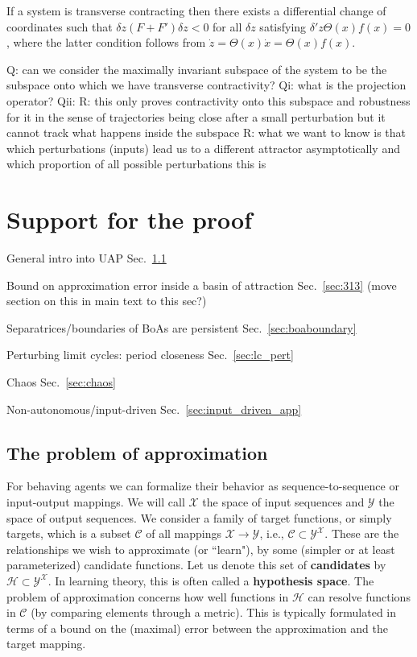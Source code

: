 \documentclass{article}
\newcommand{\ascomment}[1]{\textcolor{ascolor}{(#1)}}
\theoremstyle{definition} \newtheorem{definition}{Definition}
\theoremstyle{remark} \newtheorem{remark}{Remark}
\newcounter{ct}
\begin{document}
If a system is transverse contracting then there exists a differential change of coordinates such that $\delta z(F + F')\delta z < 0$ for all $\delta z$ satisfying $\delta' z \Theta(x)f (x) = 0$, where the latter condition follows from  $\dot z= \Theta(x) \dot x = \Theta(x)f (x)$.

Q: can we consider the maximally invariant subspace of the system to be the subspace onto which we have transverse contractivity?
Qi: what is the projection operator?
Qii: 
R: this only proves contractivity onto this subspace and robustness for it in the sense of trajectories being close after a small perturbation but it cannot track what happens inside the subspace
R: what we want to know is that which perturbations (inputs) lead us to a different attractor asymptotically and which proportion of all possible perturbations this is 






\newpage
\section{Support for the proof}
General intro into UAP Sec.~\ref{sec:approximationtheory}

Bound on approximation error inside a basin of attraction Sec.~\ref{sec:313} \ascomment{move section on this in main text to this sec?}

Separatrices/boundaries of BoAs are persistent Sec.~\ref{sec:boaboundary}

Perturbing limit cycles: period closeness Sec.~\ref{sec:lc_pert}

Chaos Sec.~\ref{sec:chaos} 

Non-autonomous/input-driven Sec.~\ref{sec:input_driven_app} 

\subsection{The problem of approximation}\label{sec:approximationtheory} %
For behaving agents we can formalize their behavior as sequence-to-sequence or input-output mappings.
We will call $\mathcal{X}$ the space of input sequences and $\mathcal{Y}$ the space of output sequences.
We consider a family of target functions, or simply targets, which is a subset \(\mathcal{C} \) of all mappings \( \mathcal{X} \rightarrow \mathcal{Y} \), i.e., \( \mathcal{C} \subset \mathcal{Y}^\mathcal{X} \). 
These are the relationships we wish to approximate (or ``learn"), by some (simpler or at least parameterized) candidate functions.
Let us denote this set of \textbf{candidates} by \( \mathcal{H} \subset \mathcal{Y}^\mathcal{X} \).
In learning theory, this is often called a \textbf{hypothesis space}.
The problem of approximation concerns how well functions in \( \mathcal{H} \) can resolve functions in \( \mathcal{C} \) (by comparing elements through a metric).
This is typically formulated in terms of a bound on the (maximal) error between the approximation and the target mapping.
\end{document}

